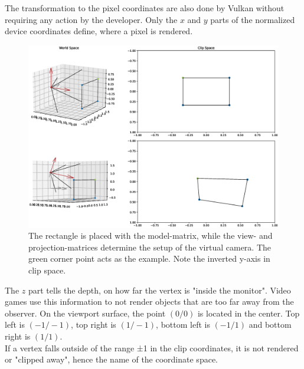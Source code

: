 The transformation to the pixel coordinates are also done by Vulkan without requiring any action by the developer. Only the $x$ and $y$ parts of the normalized device coordinates define, where a pixel is rendered. 
\begin{figure}[H]
    \centering
    \includegraphics[width=1.0\textwidth]{images/Vulkan_coordinates.eps}
    \caption{The rectangle is placed with the model-matrix, while the view- and projection-matrices determine the setup of the virtual camera. The green corner point acts as the example. Note the inverted y-axis in clip space.}
    \label{im:VulkanCoords}
\end{figure}
 The $z$ part tells the depth, on how far the vertex is "inside the monitor". Video games use this information to not render objects that are too far away from the observer. On the viewport surface, the point $(0 / 0)$ is located in the center. Top left is $(-1 / -1)$, top right is $(1 / -1)$, bottom left is $(-1 / 1)$ and bottom right is $(1 / 1)$.\\
If a vertex falls outside of the range ±1 in the clip coordinates, it is not rendered or "clipped away", hence the name of the coordinate space.

